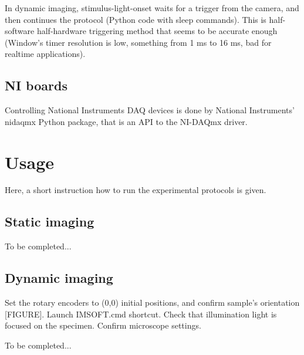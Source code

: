 \documentclass{article}
\begin{document}
In dynamic imaging, stimulus-light-onset waits for a trigger from the camera, and then continues the protocol (Python code with sleep commands).
This is half-software half-hardware triggering method that seems to be accurate enough (Window's timer resolution is low, something from 1 ms to 16 ms, bad for realtime applications).


\subsection{NI boards}
Controlling National Instruments DAQ devices is done by National Instruments' nidaqmx Python package, that is an API to the NI-DAQmx driver.


\section{Usage}

Here, a short instruction how to run the experimental protocols is given.


\subsection{Static imaging}

To be completed...

\subsection{Dynamic imaging}

Set the rotary encoders to (0,0) initial positions, and confirm sample's orientation [FIGURE].
Launch IMSOFT.cmd shortcut.
Check that illumination light is focused on the specimen.
Confirm microscope settings.

To be completed...
\end{document}
